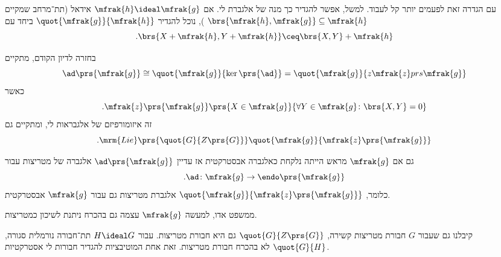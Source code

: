 \documentclass[10pt, twoside]{book}
\newcommand{\Lie}{\mrm{Lie}}
\begin{document}
עם הגדרה זאת לפעמים יותר קל לעבוד. למשל, אפשר להגדיר כך מנה של אלגברת לי. אם
$\mfrak{h} \ideal \mfrak{g}$
אידאל (תת־מרחב שמקיים
$\brs{\mfrak{h}, \mfrak{g}} \subseteq \mfrak{h}$%
), נוכל להגדיר
$\quot{\mfrak{g}}{\mfrak{h}}$
ביחד עם
\[\text{.} \brs{X + \mfrak{h}, Y + \mfrak{h}} \ceq \brs{X,Y} + \mfrak{h}\]

בחזרה לדיון הקודם, מתקיים
\[\ad\prs{\mfrak{g}} \cong \quot{\mfrak{g}}{\ker\prs{\ad}} = \quot{\mfrak{g}}{z\mfrak{z} prs{\mfrak{g}}}\]
כאשר
\[\text{.} \mfrak{z}\prs{\mfrak{g}}\prs{X \in \mfrak{g}}{\forall Y \in \mfrak{g} \colon \brs{X,Y} = 0}\]
זה איזומורפיזם של אלגבראות לי, ומתקיים גם
\[\text{.} \Lie\prs{\quot{G}{Z\prs{G}}} \quot{\mfrak{g}}{\mfrak{z}\prs{\mfrak{g}}}\]

\begin{remark}
גם אם
$\mfrak{g}$
מראש הייתה נלקחת כאלגברה אבסטרקטית אז עדיין
$\ad\prs{\mfrak{g}}$
אלגברה של מטריצות עבור
\[\text{.} \ad \colon \mfrak{g} \to \endo\prs{\mfrak{g}}\]
כלומר,
$\quot{\mfrak{g}}{\mfrak{z}\prs{\mfrak{g}}}$
אלגברת מטריצות גם עבור
$\mfrak{g}$
אבסטרקטית.

ממשפט אדו, למעשה
$\mfrak{g}$
עצמה גם בהכרח ניתנת לשיכון כמטריצות.

קיבלנו גם שעבור
$G$
חבורת מטריצות קשירה,
$\quot{G}{Z\prs{G}}$
גם היא חבורת מטריצות.
עבור
$H \ideal G$
תת־חבורה נורמלית סגורה,
$\quot{G}{H}$
לא בהכרח חבורת מטריצות.
זאת אחת המוטיבציות להגדיר חבורות לי אסטרקטיות.
\end{remark}
\end{document}
